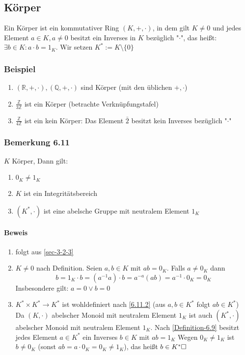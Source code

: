 \documentclass[a4paper]{scrartcl}
\theoremstyle{definition}
\theoremstyle{plain}
\theoremstyle{plain}
\theoremstyle{remark}
\theoremstyle{remark}
\theoremstyle{remark}
\theoremstyle{remark}
\theoremstyle{remark}
\begin{document}
\subsection{Körper}
\label{sec-3-3}
\label{Definition-6.9}
Ein Körper ist ein kommutativer Ring $(K,+,\cdot)$, in dem gilt $K\neq 0$ und jedes Element $a\in K, a\neq 0$ besitzt ein Inverses in $K$ bezüglich "$\cdot$", das heißt: $\exists b\in K:a\cdot b = 1_K$. Wir setzen $K^\ast := K\setminus\{0\}$
\subsubsection{Beispiel}
\label{sec-3-3-1}
\begin{enumerate}
\item $(\mathbb{R},+,\cdot),(\mathbb{Q},+,\cdot)$ sind Körper (mit den üblichen $+,\cdot$)
\item $\frac{\mathbb{Z}}{3\mathbb{Z}}$ ist ein Körper (betrachte Verknüpfungstafel)
\item $\frac{\mathbb{Z}}{4\mathbb{Z}}$ ist ein kein Körper: Das Element $\bar 2$ besitzt kein Inverses bezüglich "$\cdot$"
\end{enumerate}
\subsubsection{Bemerkung 6.11}
\label{sec-3-3-2}
\label{remark:integ_neutral}
$K$ Körper, Dann gilt:
\begin{enumerate}
\item $0_K \neq 1_K$
\item \label{6.11.2} $K$ ist ein Integritätsbereich
\item $(K^\ast,\cdot)$ ist eine abelsche Gruppe mit neutralem Element $1_K$
\end{enumerate}
\paragraph{Beweis}
\label{sec-3-3-2-1}
\begin{enumerate}
\item folgt aus \ref{sec-3-2-3}
\item $K\neq 0$ nach Definition. Seien $a,b\in K$ mit $a b = 0_K$. Falls $a\neq 0_K$ dann
\[b = 1_K \cdot b = (a^{-1} a)\cdot b = a^{-a}(a b) = a^{-1}\cdot 0_K = 0_K\]
Insbesondere gilt: $a = 0\vee b = 0$
\item $K^\ast\times K^\ast \to K^\ast$ ist wohldefiniert nach \ref{6.11.2} (aus $a,b\in K^\ast$ folgt $a b\in K^\ast$) \\
        Da $(K,\cdot)$ abelscher Monoid mit neutralem Element $1_K$ ist auch $(K^\ast,\cdot)$ abelscher Monoid mit neutralem Element $1_K$.
Nach \ref{Definition-6.9} besitzt jedes Element $a\in K^\ast$ ein Inverses $b\in K$ mit $a b = 1_K$ Wegen $0_K \neq 1_K$ ist $b\neq 0_K$ (sonst $a b = a\cdot 0_K = 0_K \neq 1_K$), das heißt $b\in K^\ast\hfill\square$
\end{enumerate}
\end{document}
